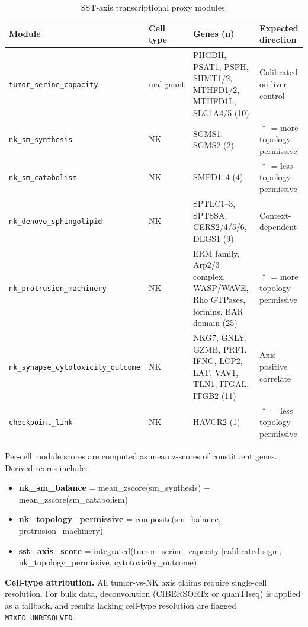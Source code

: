 \documentclass[modern,large,numbered,nocrop]{oup-authoring-template}
\begin{document}
\begin{table}[htbp]
\caption{SST-axis transcriptional proxy modules.}
\footnotesize
\begin{tabularx}{\textwidth}{@{}lXXX@{}}
\toprule
Module & Cell type & Genes (n) & Expected direction \\
\midrule
\texttt{tumor\_serine\_capacity} & malignant & PHGDH, PSAT1, PSPH, SHMT1/2, MTHFD1/2, MTHFD1L, SLC1A4/5 (10) & Calibrated on liver control \\
\texttt{nk\_sm\_synthesis} & NK & SGMS1, SGMS2 (2) & $\uparrow$ = more topology-permissive \\
\texttt{nk\_sm\_catabolism} & NK & SMPD1--4 (4) & $\uparrow$ = less topology-permissive \\
\texttt{nk\_denovo\_sphingolipid} & NK & SPTLC1--3, SPTSSA, CERS2/4/5/6, DEGS1 (9) & Context-dependent \\
\texttt{nk\_protrusion\_machinery} & NK & ERM family, Arp2/3 complex, WASP/WAVE, Rho GTPases, formins, BAR domain (25) & $\uparrow$ = more topology-permissive \\
\texttt{nk\_synapse\_cytotoxicity\_outcome} & NK & NKG7, GNLY, GZMB, PRF1, IFNG, LCP2, LAT, VAV1, TLN1, ITGAL, ITGB2 (11) & Axis-positive correlate \\
\texttt{checkpoint\_link} & NK & HAVCR2 (1) & $\uparrow$ = less topology-permissive \\
\bottomrule
\end{tabularx}
\end{table}

Per-cell module scores are computed as mean z-scores of constituent genes. Derived scores include:

\begin{itemize}
\item \textbf{nk\_sm\_balance} = mean\_zscore(sm\_synthesis) $-$ mean\_zscore(sm\_catabolism)
\item \textbf{nk\_topology\_permissive} = composite(sm\_balance, protrusion\_machinery)
\item \textbf{sst\_axis\_score} = integrated(tumor\_serine\_capacity [calibrated sign], nk\_topology\_permissive, cytotoxicity\_outcome)
\end{itemize}

\textbf{Cell-type attribution.} All tumor-vs-NK axis claims require single-cell resolution. For bulk data, deconvolution (CIBERSORTx or quanTIseq) is applied as a fallback, and results lacking cell-type resolution are flagged \texttt{MIXED\_UNRESOLVED}.
\end{document}
